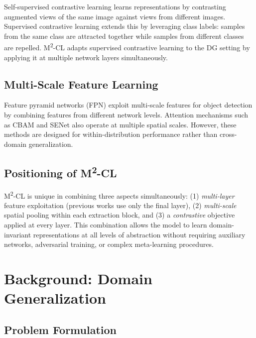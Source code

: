 \documentclass[12pt,a4paper]{article}
\begin{document}
Self-supervised contrastive learning \citep{chen2020simclr} learns representations by
contrasting augmented views of the same image against views from different images.
Supervised contrastive learning \citep{khosla2020} extends this by leveraging class labels:
samples from the same class are attracted together while samples from different classes are
repelled. M\textsuperscript{2}-CL adapts supervised contrastive learning to the DG setting
by applying it at multiple network layers simultaneously.

\subsection{Multi-Scale Feature Learning}

Feature pyramid networks (FPN) \citep{lin2017} exploit multi-scale features for object
detection by combining features from different network levels. Attention mechanisms such
as CBAM \citep{woo2018} and SENet \citep{hu2018} also operate at multiple spatial scales.
However, these methods are designed for within-distribution performance rather than
cross-domain generalization.

\subsection{Positioning of M\textsuperscript{2}-CL}

M\textsuperscript{2}-CL is unique in combining three aspects simultaneously:
(1) \emph{multi-layer} feature exploitation (previous works use only the final layer),
(2) \emph{multi-scale} spatial pooling within each extraction block, and
(3) a \emph{contrastive} objective applied at every layer. This combination allows the
model to learn domain-invariant representations at all levels of abstraction without
requiring auxiliary networks, adversarial training, or complex meta-learning procedures.

\section{Background: Domain Generalization}
\label{sec:background}

\subsection{Problem Formulation}
\end{document}
